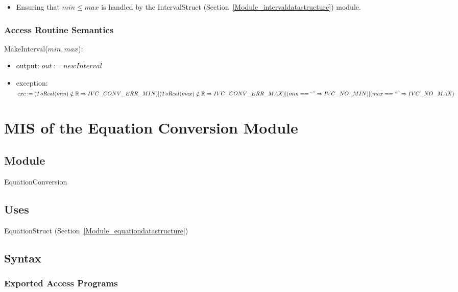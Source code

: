 \documentclass[12pt, titlepage]{article}
\begin{document}
\begin{itemize}
	\item Ensuring that $min \leq max$ is handled by the IntervalStruct 
	(Section~\ref{Module_intervaldatastructure}) module.
\end{itemize}

\subsubsection{Access Routine Semantics}

\noindent MakeInterval($min, max$):
\begin{itemize}
	\item output: $out := newInterval$
	\item exception: $exc := \\
	(ToReal(min) \notin \mathbb{R} \Rightarrow IVC\_CONV\_ERR\_MIN)\\
	|\\
	(ToReal(max) \notin \mathbb{R} \Rightarrow IVC\_CONV\_ERR\_MAX)\\
	|\\
	(min == ``" \Rightarrow IVC\_NO\_MIN)\\
	|\\
	(max == ``" \Rightarrow IVC\_NO\_MAX)$
\end{itemize}

\newpage

\section{MIS of the Equation Conversion Module} 
\label{Module_equationconversion}

\subsection{Module}

EquationConversion

\subsection{Uses}

EquationStruct (Section~\ref{Module_equationdatastructure})

\subsection{Syntax}

\subsubsection{Exported Access Programs}
\end{document}
